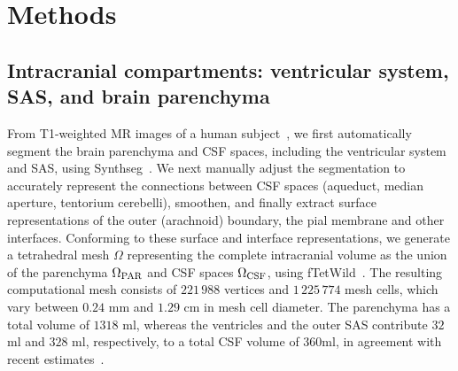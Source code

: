 \documentclass[fleqn,10pt]{wlscirep}
\newcommand{\mer}[1]{\textcolor{magenta}{#1}}
\begin{document}
\section*{Methods}


\subsection*{Intracranial compartments: ventricular system, SAS, and brain parenchyma}

From T1-weighted MR images of a human subject~\cite{hodneland2019new},
we first automatically segment the brain parenchyma and CSF spaces,
including the ventricular system and SAS, using
Synthseg~\cite{billot2023robust,billot2023synthseg}. We next manually
adjust the segmentation to accurately represent the connections
between CSF spaces (aqueduct, median aperture, tentorium cerebelli), smoothen, and finally
extract surface representations of the outer (arachnoid) boundary, the
pial membrane and other interfaces. Conforming to these surface and
interface representations, we generate a tetrahedral mesh $\Omega$
representing the complete intracranial volume as the union of the
parenchyma $\Omega_{\rm PAR}$ and CSF spaces $\Omega_{\rm CSF}$, using
fTetWild~\cite{hu2020fast}. The resulting computational mesh consists
of $221\,988$ vertices and $1\,225\,774$ mesh cells, which vary between
$0.24$ mm and $1.29$ cm in mesh cell diameter. The parenchyma has a
total volume of $1318$ ml, whereas the ventricles and the outer SAS
contribute $32$ ml and $328$ ml, respectively, to a total CSF volume
of $360$ml, in agreement with recent estimates~\cite{hladky2024regulation}.


\end{document}
